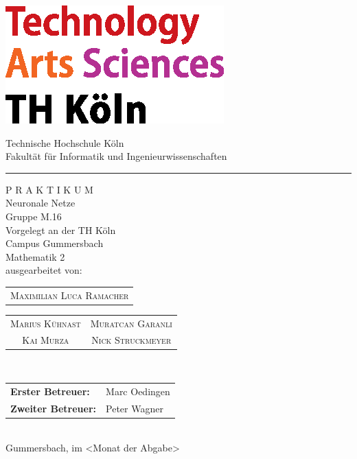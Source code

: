 \documentclass[a4paper,12pt,oneside]{article}
\begin{document}
  \pagestyle{empty} %
  \newpage %
  
  \pagestyle{empty}
  \begin{titlepage}
    \includegraphics[scale=1.00]{Sources/logo_TH-Koeln_CMYK_22pt}\\
    \begin{center}
      \Large
      Technische Hochschule Köln\\
      Fakultät für Informatik und Ingenieurwissenschaften\\
      \hrule\par\rule{0pt}{2cm} %
      \LARGE
      \textsc{P R A K T I K U M}\\
      \vspace{1cm} %
      \huge
      Neuronale Netze\\
      \Large
      Gruppe M.16\\
      \vspace{1.5cm}
      \large
      Vorgelegt an der TH Köln\\
      Campus Gummersbach\\
      Mathematik 2\\ 
      \vspace{1.0cm}
      ausgearbeitet von:\\
      \begin{tabular}{c}
        \textsc{Maximilian Luca Ramacher}
      \end{tabular}
      \begin{tabular}{c c}
        \textsc{Marius Kühnast} &
        \textsc{Muratcan Garanli}\\
        \textsc{Kai Murza} &
        \textsc{Nick Struckmeyer}\\
      \end{tabular}\\
      \vspace{1.5cm}
      \begin{tabular}{ll} %
          \textbf{Erster Betreuer:} & Marc Oedingen \\
          \textbf{Zweiter Betreuer:} & Peter Wagner \\
      \end{tabular}
      \vspace{1.5cm}
      \\Gummersbach, im <Monat der Abgabe>
    \end{center}    
  \end{titlepage}
  
\end{document}
